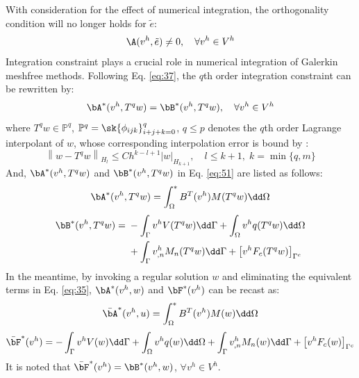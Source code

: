 With consideration for the effect of numerical integration, the orthogonality condition will no longer holds for $\tilde{e}$:
\begin{equation}\label{eq:50}
\A(v^{h},\tilde{e})\neq0,\quad \forall v^{h}\in V^{h}
\end{equation}
Integration constraint plays a crucial role in numerical integration of Galerkin meshfree methods.
Following Eq. \eqref{eq:37}, the $q$th order integration constraint can be rewritten by:
\begin{equation}\label{eq:51}
\bA^{*}(v^{h},T^{q}w)=\bB^{*}(v^{h},T^{q}w),\quad \forall v^{h}\in V^{h}
\end{equation}
where $T^{q}w\in\mathbb{P}^{q}$, $\mathbb{P}^{q}=\sk\{\phi_{ijk}\}_{i+j+k=0}^{q}$, $q\le p$ denotes the $q$th order Lagrange interpolant of $w$, whose corresponding interpolation error is bound by \cite{ref51}:
\begin{equation}\label{eq:52}
\left\|w-T^{q}w\right\|_{H_l}\le Ch^{k-l+1}|w|_{H_{k+1}},\quad l\le k+1,\;k=\min\{q,m\}
\end{equation}
And, $\bA^{*}(v^{h},T^{q}w)$ and $\bB^{*}(v^{h},T^{q}w)$ in Eq. \eqref{eq:51} are listed as follows:
\begin{equation}\label{eq:53}
\bA^{*}(v^{h},T^{q}w)=\int_{\Omega}^{*}B^{T}(v^{h})M(T^{q}w)\dd\Omega
\end{equation}
\begin{equation}\label{eq:54}
\begin{aligned}
\bB^{*}(v^{h},T^{q}w)={}&-\int_{\Gamma}v^{h}V(T^{q}w)\dd\Gamma+\int_{\Omega}v^{h}q(T^{q}w)\dd\Omega\\
&+\int_{\Gamma}v^{h}_{,n}M_n(T^{q}w)\dd\Gamma+\left[v^{h}F_c(T^{q}w)\right]_{\Gamma^{c}}
\end{aligned}
\end{equation}
In the meantime, by invoking a regular solution $w$ and eliminating the equivalent terms in Eq. \eqref{eq:35}, $\bA^{*}(v^{h},w)$ and $\bF^{*}(v^{h})$ can be recast as:
\begin{equation}\label{eq:55}
\bar{\bA}^{*}(v^{h},u)=\int_{\Omega}^{*}B^{T}(v^{h})M(w)\dd\Omega
\end{equation}
\begin{equation}\label{eq:56}
\bar{\bF}^{*}(v^{h})=-\int_{\Gamma}v^{h}V(w)\dd\Gamma+\int_{\Omega}v^{h}q(w)\dd\Omega+\int_{\Gamma}v^{h}_{,n}M_n(w)\dd\Gamma+\left[v^{h}F_c(w)\right]_{\Gamma^{c}}
\end{equation}
It is noted that $\bar{\bF}^{*}(v^{h})=\bB^{*}(v^{h},w)$, $\forall v^{h}\in V^{h}$.

